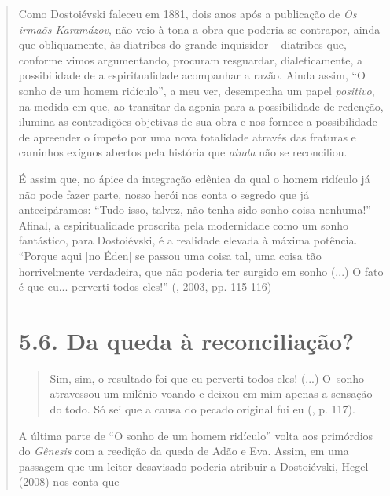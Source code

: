 {\begin{quote}
Como Dostoiévski faleceu em 1881, dois anos após a publicação de
\emph{Os irmaõs Karamázov}, não veio à tona a obra que poderia se
contrapor, ainda que obliquamente, às diatribes do grande inquisidor --
diatribes que, conforme vimos argumentando, procuram resguardar,
dialeticamente, a possibilidade de a espiritualidade acompanhar a razão.
Ainda assim, ``O sonho de um homem ridículo'', a meu ver, desempenha um
papel \emph{positivo}, na medida em que, ao transitar da agonia para a
possibilidade de redenção, ilumina as contradições objetivas de sua obra
e nos fornece a possibilidade de apreender o ímpeto por uma nova
totalidade através das fraturas e caminhos exíguos abertos pela história
que \emph{ainda} não se reconciliou.

É assim que, no ápice da integração edênica da qual o homem ridículo já
não pode fazer parte, nosso herói nos conta o segredo que já
antecipáramos: ``Tudo isso, talvez, não tenha sido sonho coisa
nenhuma!'' Afinal, a espiritualidade proscrita pela modernidade como um
sonho fantástico, para Dostoiévski, é a realidade elevada à máxima
potência. ``Porque aqui {[}no Éden{]} se passou uma coisa tal, uma coisa
tão horrivelmente verdadeira, que não poderia ter surgido em sonho (...)
O fato é que eu... perverti todos eles!'' (, 2003, pp.
115-116)

\section{5.6. Da queda à reconciliação?}

\begin{quote}
Sim, sim, o resultado foi que eu perverti todos eles! (...) O~sonho
atravessou um milênio voando e deixou em mim apenas a sensação do todo.
Só sei que a causa do pecado original fui eu (, p. 117).
\end{quote}

A última parte de ``O sonho de um homem ridículo'' volta aos primórdios
do \emph{Gênesis} com a reedição da queda de Adão e Eva. Assim, em uma
passagem que um leitor desavisado poderia atribuir a Dostoiévski, Hegel
(2008) nos conta que


\end{quote}}
